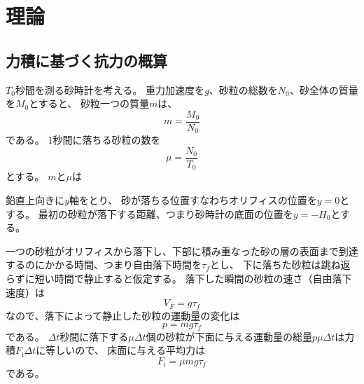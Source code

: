 \documentclass[dvipdfmx]{article}
\begin{document}
\section{理論}


\subsection{力積に基づく抗力の概算}

$T_0$秒間を測る砂時計を考える。
重力加速度を$g$、砂粒の総数を$N_0$、砂全体の質量を$M_0$とすると、
砂粒一つの質量$m$は、
\begin{equation} \label{250517100232} 
   m = \frac{M_0}{N_0} 
\end{equation}
である。
1秒間に落ちる砂粒の数を
\begin{equation} \label{250515082817} 
   \mu = \frac{N_0}{T_0}
\end{equation}
とする。
$m$と$\mu$は


鉛直上向きに$y$軸をとり、
砂が落ちる位置すなわちオリフィスの位置を$y=0$とする。
最初の砂粒が落下する距離、つまり砂時計の底面の位置を$y=-H_0$とする。


一つの砂粒がオリフィスから落下し、下部に積み重なった砂の層の表面まで到達するのにかかる時間、つまり自由落下時間を$\tau_f$とし、
下に落ちた砂粒は跳ね返らずに短い時間で静止すると仮定する。
落下した瞬間の砂粒の速さ（自由落下速度）は
\begin{equation} \label{250512190520} 
   V_F = g\tau_f
\end{equation}
なので、落下によって静止した砂粒の運動量の変化は
\begin{equation} \label{250512190655} 
   p = mg\tau_f
\end{equation}
である。
$\Delta t$秒間に落下する$\mu \Delta t$個の砂粒が下面に与える運動量の総量$p\mu \Delta t$は力積$F_\mathrm{i} \Delta t$に等しいので、
床面に与える平均力は
\begin{equation} \label{250515093535} 
  F_\mathrm{i}   = \mu m g \tau_f
\end{equation}
である。
\end{document}
